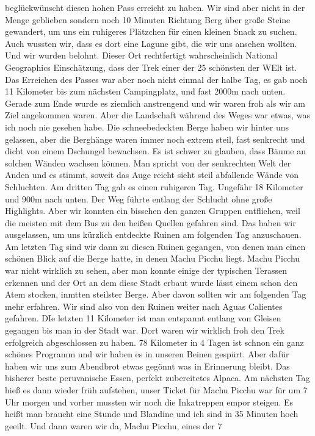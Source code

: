 \documentclass[11pt]{book}
\begin{document}
beglückwünscht diesen hohen Pass erreicht zu haben. Wir sind aber nicht in der Menge geblieben sondern noch 10 Minuten Richtung Berg über große Steine gewandert, 
um uns ein ruhigeres Plätzchen für einen kleinen Snack zu suchen. Auch wussten wir, dass es dort eine Lagune gibt, die wir uns ansehen wollten. Und wir 
wurden belohnt. Dieser Ort rechtfertigt wahrscheinlich National Geographics Einschätzung, dass der Trek einer der 25 schönsten der WElt ist. Das Erreichen 
des Passes war aber noch nicht einmal der halbe Tag, es gab noch 11 Kilometer bis zum nächsten Campingplatz, und fast 2000m nach unten. Gerade zum Ende wurde 
es ziemlich anstrengend und wir waren froh als wir am Ziel angekommen waren. Aber die Landschaft während des Weges war etwas, was ich noch nie gesehen habe. 
Die schneebedeckten Berge haben wir hinter uns gelassen, aber die Berghänge waren immer noch extrem steil, fast senkrecht und dicht von einem Dschungel 
bewachsen. Es ist schwer zu glauben, dass Bäume an solchen Wänden wachsen können. Man spricht von der senkrechten Welt der Anden und es stimmt, soweit das Auge 
reicht sieht steil abfallende Wände von Schluchten. Am dritten Tag gab es einen ruhigeren Tag. Ungefähr 18 Kilometer und 900m nach unten. Der Weg führte entlang 
der Schlucht ohne große Highlights. Aber wir konnten ein bisschen den ganzen Gruppen entfliehen, weil die meisten mit dem Bus zu den heißen Quellen 
gefahren sind. Das haben wir ausgelassen, um uns kürzlich entdeckte Ruinen am folgenden Tag anzuschauen. Am letzten Tag sind wir dann zu diesen Ruinen 
gegangen, von denen man einen schönen Blick auf die Berge hatte, in denen Machu Picchu liegt. Machu Picchu war nicht wirklich zu sehen, aber man konnte 
einige der typischen Terassen erkennen und der Ort an dem diese Stadt erbaut wurde lässt einem schon den Atem stocken, inmtten steilster Berge. Aber davon 
sollten wir am folgenden Tag mehr erfahren. Wir sind also von den Ruinen weiter nach Aguas Calientes gefahren. DIe letzten 11 Kilometer ist man entspannt 
entlang von Gleisen gegangen bis man in der Stadt war. Dort waren wir wirklich froh den Trek erfolgreich abgeschlossen zu haben. 78 Kilometer in 4 Tagen ist schnon 
ein ganz schönes Programm und wir haben es in unseren Beinen gespürt. Aber dafür haben wir uns zum Abendbrot etwas gegönnt was in Erinnerung bleibt. Das bisherer 
beste peruvanische Essen, perfekt zubereitetes Alpaca. 
Am nächsten Tag hieß es dann wieder früh aufstehen, unser Ticket für Machu Picchu war für um 7 Uhr morgen und vorher mussten wir noch die Inkatreppen 
empor steigen. Es heißt man braucht eine Stunde und Blandine und ich sind in 35 Minuten hoch geeilt. Und dann waren wir da, Machu Picchu, eines der 7 
\end{document}
